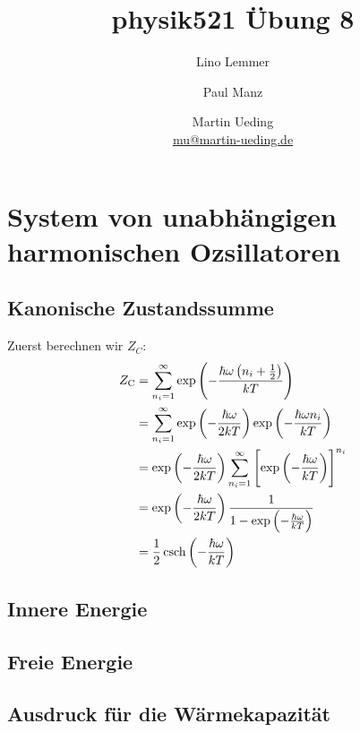 

\title{physik521 Übung 8}
\author{
    Lino Lemmer
    \and
    Paul Manz
    \and
    Martin Ueding \\ {\small \href{mailto:mu@martin-ueding.de}{mu@martin-ueding.de}}
}



\maketitle

\section{System von unabhängigen harmonischen Ozsillatoren}

\subsection{Kanonische Zustandssumme}

Zuerst berechnen wir $Z_C$:
\begin{align*}
    Z_\text C
    &= \sum_{n_i=1}^\infty \exp\del{- \frac{\hbar\omega \del{n_i + \frac 12}}{kT}} \\
    &= \sum_{n_i=1}^\infty \exp\del{- \frac{\hbar\omega}{2kT}} \exp\del{- \frac{\hbar\omega n_i}{kT}} \\
    &= \exp\del{- \frac{\hbar\omega}{2kT}} \sum_{n_i=1}^\infty \sbr{\exp\del{- \frac{\hbar\omega}{kT}}}^{n_i} \\
    &= \exp\del{- \frac{\hbar\omega}{2kT}} \frac1{1 - \exp\del{- \frac{\hbar\omega}{kT}}} \\
    &= \frac 12 \csch\del{- \frac{\hbar\omega}{kT}} \\
\end{align*}

\subsection{Innere Energie}

\subsection{Freie Energie}

\subsection{Ausdruck für die Wärmekapazität}


